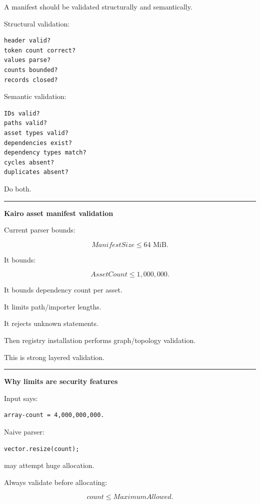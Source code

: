 A manifest should be validated structurally and semantically.

Structural validation:

\begin{verbatim}
header valid?
token count correct?
values parse?
counts bounded?
records closed?
\end{verbatim}

Semantic validation:

\begin{verbatim}
IDs valid?
paths valid?
asset types valid?
dependencies exist?
dependency types match?
cycles absent?
duplicates absent?
\end{verbatim}

Do both.

\begin{center}\rule{0.5\linewidth}{0.5pt}\end{center}

\textbf{Kairo asset manifest validation}

Current parser bounds:

\[
ManifestSize\le64\text{ MiB}.
\]

It bounds:

\[
AssetCount\le1,000,000.
\]

It bounds dependency count per asset.

It limits path/importer lengths.

It rejects unknown statements.

Then registry installation performs graph/topology validation.

This is strong layered validation.

\begin{center}\rule{0.5\linewidth}{0.5pt}\end{center}

\textbf{Why limits are security features}

Input says:

\begin{verbatim}
array-count = 4,000,000,000.
\end{verbatim}

Naive parser:

\begin{verbatim}
vector.resize(count);
\end{verbatim}

may attempt huge allocation.

Always validate before allocating:

\[
count\le MaximumAllowed.
\]

